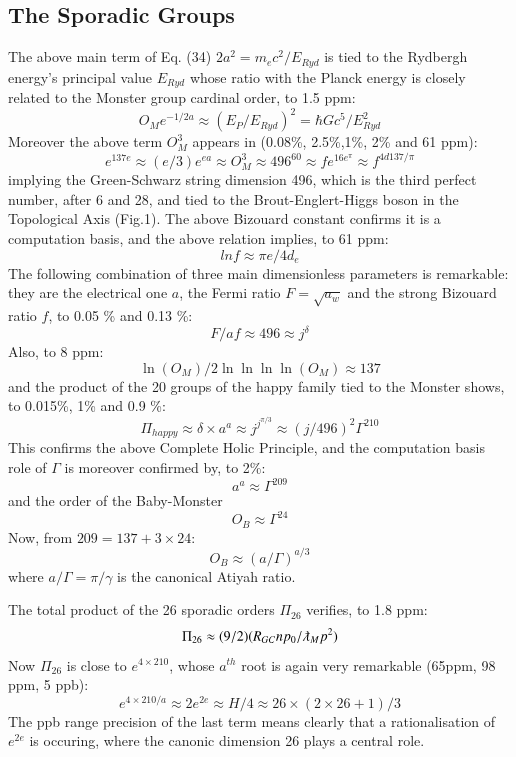 \documentclass[twoside,draft]{article}
\begin{document}
\begin{sloppypar}
\subsection{The Sporadic Groups}

The above main term of Eq. (34) $2a^{2} = m_{e} c^{2}/E_{Ryd}$ is
tied to the Rydbergh energy's principal value $E_{Ryd}$ whose ratio with the Planck energy is closely
related to the Monster group cardinal order, to 1.5 ppm:
\begin{equation}
O_{M} e^{-1/2a} \approx (E_{P} /E_{Ryd})^{2} = \hbar Gc^{5}/E_{Ryd}^{2}
\end{equation}
Moreover the above term $O_M^3$ appears in (0.08\%, 2.5\%,1\%, 2\% and 61 ppm):
\begin{equation}
e^{137e}\approx (e/3)e^{ea}\approx O_M^3 \approx 496^{60} \approx fe^{16e^\pi} \approx f^{4d137/\pi}
\end{equation}
implying the Green-Schwarz string dimension 496, which is the third perfect number, after 6 and 28, and tied to the Brout-Englert-Higgs boson in the Topological Axis (Fig.1). The above Bizouard constant confirms it is a computation basis, and the above relation implies, to 61 ppm:
\begin{equation}
lnf\approx \pi e/4d_e
\end{equation}
The following combination of three main dimensionless parameters is remarkable: they are the electrical
one $a$, the Fermi ratio $F =\sqrt{a_{w}}$ and the strong Bizouard ratio $f$, to 0.05 \% and 0.13 \%:
\begin{equation}
F/af \approx 496\approx j^{\delta}
\end{equation}
Also, to 8 ppm: $$\ln(O_{M}) /2\ln\ln\ln\ln(O_{M}) \approx 137$$ and the product of the 20 groups of the happy family tied
to the Monster shows, to 0.015\%, 1\% and 0.9 \%:
\begin{equation}
\Pi_{happy} \approx \delta \times a^{a} \approx j^{j^{\pi/3}} \approx (j/496)^2 \Gamma^{210}
\end{equation}
This confirms the above Complete Holic Principle, and the computation basis role of $\Gamma$ is moreover confirmed by, to 2\%: $$a^a \approx \Gamma^{209}$$ and the order of the Baby-Monster $$O_B\approx\Gamma^{24}$$ Now, from $209 = 137 + 3\times 24$:
\begin{equation}
O_B \approx (a/\Gamma)^{a/3}
\end{equation}
where $a/\Gamma = \pi/\gamma $ is the canonical Atiyah ratio.

The total product of the 26 sporadic orders $\Pi_{26}$ verifies, to 1.8 ppm:
$$ \Pi_{26} \approx (9/2)(R_{GC}np_0/\lambdabar_M p^2)$$
Now $\Pi_{26}$ is close to $e^{4 \times 210}$, whose $a^{th}$ root is again very remarkable (65ppm, 98 ppm, 5 ppb):
\begin{equation}
e^{4 \times 210/a} \approx 2e^{2e} \approx H/4 \approx 26 \times (2 \times 26 + 1)/3
\end{equation}
The ppb range precision of the last term means clearly that a rationalisation of $e^{2e}$ is occuring, where the canonic dimension 26 plays a central role.


\end{sloppypar}
\end{document}
